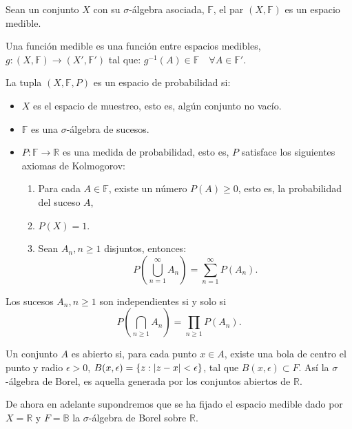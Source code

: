\documentclass[../proyecto.tex]{memoir}
\begin{document}
\begin{defi}
Sean un conjunto $X$ con su $\sigma$-álgebra asociada, $\mathds{F}$, el par $(X, \mathds{F})$ es un espacio medible. 
\end{defi}

\begin{defi}
Una función medible es una función entre espacios medibles, $g: (X, \mathds{F}) \rightarrow (X', \mathds{F}')$ tal que: $g^{-1}(A) \in \mathds{F} \quad \forall A \in \mathds{F}'$.
\end{defi}

\begin{defi}
La tupla $(X, \mathds{F}, P)$ es un espacio de probabilidad si:
\begin{itemize}
\item $X$ es el espacio de muestreo, esto es, algún conjunto no vacío.
\item $\mathds{F}$ es una $\sigma$-álgebra de sucesos.
\item $P: \mathds{F} \to \mathds{R}$ es una medida de probabilidad, 
esto es, $P$ satisface los siguientes axiomas de Kolmogorov:
\begin{enumerate}
\item Para cada $A\in\mathds{F}$, existe un número $P(A) \geq 0$, esto es, la probabilidad del suceso $A$,
\item $P(X)=1$.
\item Sean ${A_n, n \geq 1}$ disjuntos, entonces: $$
	P \left( \bigcup_{n=1}^{\infty} A_{n} \right) = \sum_{n=1}^{\infty} P(A_n).
$$
\end{enumerate}
\end{itemize}
\end{defi}

\begin{defi}
Los sucesos ${A_n, n \geq 1}$ son independientes si y solo si $$
P \left( \bigcap_{n \geq 1} A_{n} \right) = \prod_{n \geq 1} P(A_n).
$$
\end{defi}

\begin{defi}
Un conjunto $A$ es abierto si, para cada punto $x\in A$, existe una bola de centro el punto y radio $\epsilon > 0$, $B(x,\epsilon)=\{ z : \abs{z-x} < \epsilon\}$, tal que $B(x,\epsilon) \subset F$. Así la $\sigma$-álgebra de Borel, es aquella generada por los conjuntos abiertos de $\mathds{R}$.
\end{defi}

De ahora en adelante supondremos que se ha fijado el espacio medible dado por $X=\mathds{R}$ y $F=\mathds{B}$ la $\sigma$-álgebra de Borel sobre $\mathds{R}$.
\end{document}
